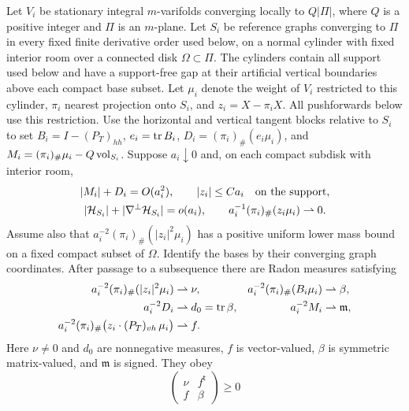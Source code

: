 \begin{proposition}\label{prop:linearized}
Let $V_i$ be stationary integral $m$-varifolds converging locally to
$Q|\Pi|$, where $Q$ is a positive integer and $\Pi$ is an $m$-plane.
Let $S_i$ be reference graphs converging to $\Pi$ in every fixed finite
derivative order used below, on a normal cylinder with fixed interior
room over a connected disk $\Omega\subset\Pi$. The cylinders contain all
support used below and have a support-free gap at their artificial vertical
boundaries above each compact base subset. Let $\mu_i$ denote the weight
of $V_i$ restricted to this cylinder, $\pi_i$ nearest projection onto
$S_i$, and $z_i=X-\pi_iX$. All pushforwards below use this restriction.
Use the horizontal and vertical tangent blocks relative to $S_i$ to set
$B_i=I-(P_T)_{hh}$, $e_i=\operatorname{tr} B_i$,
$D_i=(\pi_i)_\#(e_i\mu_i)$, and
$M_i=(\pi_i)_\#\mu_i-Q\operatorname{vol}_{S_i}$.
Suppose $a_i\downarrow0$ and, on each compact subdisk with interior room,
\begin{gather*}
 |M_i|+D_i=O(a_i^2),\qquad |z_i|\le Ca_i\quad\hbox{on the support},\\
 |\mathcal H_{S_i}|+|\nabla^\perp\mathcal H_{S_i}|=o(a_i),
 \qquad a_i^{-1}(\pi_i)_\#(z_i\mu_i)\rightharpoonup0.
\end{gather*}
Assume also that $a_i^{-2}(\pi_i)_\#(|z_i|^2\mu_i)$ has a positive
uniform lower mass bound on a fixed compact subset of $\Omega$.
Identify the bases by their converging graph coordinates. After passage
to a subsequence there are Radon measures satisfying
\begin{equation}\label{eq:limit-measures}
\begin{aligned}
 a_i^{-2}(\pi_i)_\#(|z_i|^2\mu_i)&\rightharpoonup\nu,&
 a_i^{-2}(\pi_i)_\#(B_i\mu_i)&\rightharpoonup\beta,\\
 a_i^{-2}D_i&\rightharpoonup d_0=\operatorname{tr}\beta,&
 a_i^{-2}M_i&\rightharpoonup\mathfrak m,\\
 a_i^{-2}(\pi_i)_\#\bigl(z_i\cdot(P_T)_{vh}\,\mu_i\bigr)
   &\rightharpoonup f.
\end{aligned}
\end{equation}
Here $\nu\ne0$ and $d_0$ are nonnegative measures, $f$ is vector-valued,
$\beta$ is symmetric matrix-valued, and $\mathfrak m$ is signed. They obey
\begin{equation}\label{eq:limit-psd}
 \begin{pmatrix}\nu&f^{\mathsf t}\\ f&\beta\end{pmatrix}\ge0

\end{equation}
\end{proposition}
